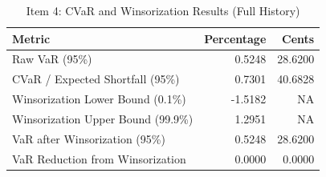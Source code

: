 \begin{table}

\caption{\label{tab:export_latex_tables}Item 4: CVaR and Winsorization Results (Full History)}
\centering
\begin{tabular}[t]{lrr}
\toprule
Metric & Percentage & Cents\\
\midrule
Raw VaR (95\%) & 0.5248 & 28.6200\\
CVaR / Expected Shortfall (95\%) & 0.7301 & 40.6828\\
Winsorization Lower Bound (0.1\%) & -1.5182 & NA\\
Winsorization Upper Bound (99.9\%) & 1.2951 & NA\\
VaR after Winsorization (95\%) & 0.5248 & 28.6200\\
\addlinespace
VaR Reduction from Winsorization & 0.0000 & 0.0000\\
\bottomrule
\end{tabular}
\end{table}

